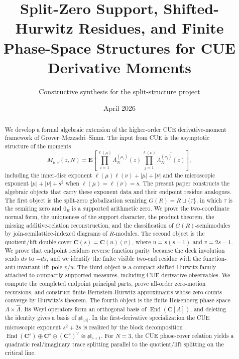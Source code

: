 \documentclass[11pt]{article}
\title{Split-Zero Support, Shifted-Hurwitz Residues, and Finite Phase-Space Structures for CUE Derivative Moments}
\author{Constructive synthesis for the split-structure project}
\date{April 2026}
\newcommand{\C}{\mathbf C}
\newcommand{\End}{\operatorname{End}}
\theoremstyle{plain}
\theoremstyle{definition}
\begin{document}
\maketitle

\begin{abstract}
We develop a formal algebraic extension of the higher-order CUE derivative-moment framework of Grover--Mezzadri--Simm.  The input from CUE is the asymptotic structure of the moments
\[
 M_{\mu,\nu}(z,N)=\mathbf E\left[
     \prod_{i=1}^{\ell(\mu)}\Lambda_N^{(\mu_i)}(z)
     \prod_{j=1}^{\ell(\nu)}\overline{\Lambda_N^{(\nu_j)}(z)}
 \right],
\]
including the inner-disc exponent \(\ell(\mu)\ell(\nu)+|\mu|+|\nu|\) and the microscopic exponent \(|\mu|+|\nu|+s^2\) when \(\ell(\mu)=\ell(\nu)=s\).  The present paper constructs the algebraic objects that carry these exponent data and their endpoint residue analogues.  The first object is the split-zero globalization semiring \(G(R)=R\sqcup\{\tau\}\), in which \(\tau\) is the semiring zero and \(0_R\) is a supported arithmetic zero.  We prove the two-coordinate normal form, the uniqueness of the support character, the product theorem, the missing additive-relation reconstruction, and the classification of \(G(R)\)-semimodules by join-semilattice-indexed diagrams of \(R\)-modules.  The second object is the quotient/lift double cover \(\C(s)=\C(u)(v)\), where \(u=s(s-1)\) and \(v=2s-1\).  We prove that endpoint residues reverse function parity because the deck involution sends \(ds\) to \(-ds\), and we identify the finite visible two-end residue with the function-anti-invariant lift pole \(v/u\).  The third object is a compact shifted-Hurwitz family attached to compactly supported measures, including CUE derivative observables.  We compute the completed endpoint principal parts, prove all-order zero-motion recursions, and construct finite Bernstein-Hurwitz approximants whose zero counts converge by Hurwitz's theorem.  The fourth object is the finite Heisenberg phase space \(A\times\widehat A\).  Its Weyl operators form an orthogonal basis of \(\End(\C[A])\), and deleting the identity gives a basis of \(\mathfrak{sl}_{|A|}\).  In the first-derivative specialization the CUE microscopic exponent \(s^2+2s\) is realized by the block decomposition \(\End(\C^s)\oplus \C^s\oplus(\C^s)^\vee\cong\mathfrak{sl}_{s+1}\).  For \(N=3\), the CUE phase-cover relation yields a quadratic real/imaginary trace splitting parallel to the quotient/lift splitting on the critical line.
\end{abstract}
\end{document}
